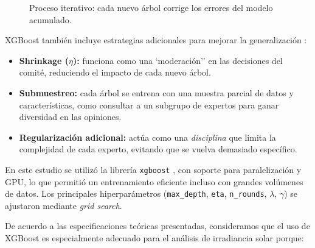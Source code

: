 \begin{figure}[H] 
\centering 
{} 
\caption{Proceso iterativo: cada nuevo árbol corrige los errores del modelo acumulado.} 
\label{fig:boosting} 
\end{figure}


XGBoost también incluye estrategias adicionales para mejorar la generalización \cite{xgboostdoc}:

\begin{itemize} 
\item \textbf{Shrinkage ($\eta$):} funciona como una `moderación'' en las decisiones del comité, reduciendo el impacto de cada nuevo árbol. 
\item \textbf{Submuestreo:} cada árbol se entrena con una muestra parcial de datos y características, como consultar a un subgrupo de expertos para ganar diversidad en las opiniones. 
\item \textbf{Regularización adicional:} actúa como una \textit{disciplina} que limita la complejidad de cada experto, evitando que se vuelva demasiado específico. 
\end{itemize}

En este estudio se utilizó la librería \texttt{xgboost} \cite{xgboostdoc}, con soporte para paralelización y GPU, lo que permitió un entrenamiento eficiente incluso con grandes volúmenes de datos. Los principales hiperparámetros (\texttt{max\_depth}, \texttt{eta}, \texttt{n\_rounds}, $\lambda$, $\gamma$) se ajustaron mediante \textit{grid search}.

De acuerdo a las especificaciones teóricas presentadas, consideramos que el uso de XGBoost es especialmente adecuado para el análisis de irradiancia solar porque:

